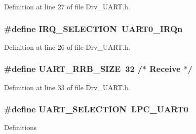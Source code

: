 Definition at line 27 of file Drv\+\_\+\+U\+A\+R\+T.\+h.

\subsubsection[{\texorpdfstring{I\+R\+Q\+\_\+\+S\+E\+L\+E\+C\+T\+I\+ON}{IRQ_SELECTION}}]{\setlength{\rightskip}{0pt plus 5cm}\#define I\+R\+Q\+\_\+\+S\+E\+L\+E\+C\+T\+I\+ON~U\+A\+R\+T0\+\_\+\+I\+R\+Qn}\hypertarget{group__UART__Library_ga7c3d3b9d5cf2685f7fdb298eaf359875}{}\label{group__UART__Library_ga7c3d3b9d5cf2685f7fdb298eaf359875}


Definition at line 26 of file Drv\+\_\+\+U\+A\+R\+T.\+h.

\subsubsection[{\texorpdfstring{U\+A\+R\+T\+\_\+\+R\+R\+B\+\_\+\+S\+I\+ZE}{UART_RRB_SIZE}}]{\setlength{\rightskip}{0pt plus 5cm}\#define U\+A\+R\+T\+\_\+\+R\+R\+B\+\_\+\+S\+I\+ZE~32	/$\ast$ Receive $\ast$/}\hypertarget{group__UART__Library_gaf9c71990720971fa35b971b5e305c05b}{}\label{group__UART__Library_gaf9c71990720971fa35b971b5e305c05b}


Definition at line 33 of file Drv\+\_\+\+U\+A\+R\+T.\+h.

\subsubsection[{\texorpdfstring{U\+A\+R\+T\+\_\+\+S\+E\+L\+E\+C\+T\+I\+ON}{UART_SELECTION}}]{\setlength{\rightskip}{0pt plus 5cm}\#define U\+A\+R\+T\+\_\+\+S\+E\+L\+E\+C\+T\+I\+ON~L\+P\+C\+\_\+\+U\+A\+R\+T0}\hypertarget{group__UART__Library_ga43200fe4a9ea07a8a7f41b484fce9a18}{}\label{group__UART__Library_ga43200fe4a9ea07a8a7f41b484fce9a18}
Definitions 

